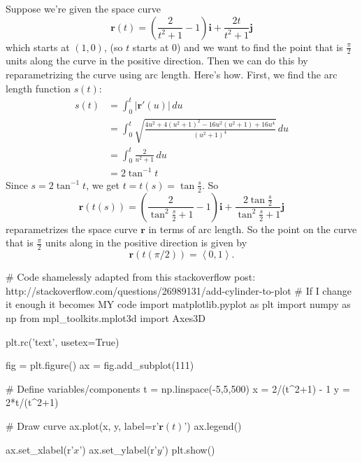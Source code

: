 \documentclass[10pt,]{book}
\theoremstyle{ptxplainnotitle}
\theoremstyle{ptxplaintitle}
\theoremstyle{ptxplainnotitle}
\theoremstyle{ptxplaintitle}
\theoremstyle{ptxplainnotitle}
\theoremstyle{ptxplaintitle}
\theoremstyle{ptxdefinitionnotitle}
\theoremstyle{ptxdefinitiontitle}
\theoremstyle{ptxdefinitionnotitle}
\theoremstyle{ptxdefinitiontitle}
\theoremstyle{ptxdefinitionnotitle}
\theoremstyle{ptxdefinitiontitle}
\theoremstyle{ptxdefinitionnotitle}
\theoremstyle{ptxdefinitiontitle}
\theoremstyle{ptxdefinitionnotitle}
\theoremstyle{ptxdefinitiontitle}
\numberwithin{equation}{section}
\newcommand{\vv}[1]{\mathbf{#1}}
\newcommand{\dotprod}[1]{\left\langle #1 \right\rangle}
\begin{document}
\begin{example}\label{example-reparametrizing-a-space-curve}
\hypertarget{p-938}{}%
Suppose we're given the space curve%
%
\begin{equation*}
\vv{r}(t) = \left(\frac{2}{t^{2}+1}-1\right)\vv{i}+\frac{2t}{t^{2}+1}\vv{j}
\end{equation*}
\hypertarget{p-939}{}%
which starts at \((1,0)\), (so \(t\) starts at \(0\)) and we want to find the point that is \(\frac{\pi}{2}\) units along the curve in the positive direction. Then we can do this by reparametrizing the curve using arc length. Here's how. First, we find the arc length function \(s(t)\):%
%
\begin{align*}
s(t) & = \int_{0}^{t}|\vv{r}'(u)|\,du \\
& = \int_{0}^{t} \sqrt{\frac{4u^{2}+4(u^{2}+1)^{2}-16u^{2}(u^{2}+1)+16u^{4}}{(u^{2}+1)^{4}}}\,du \\
& = \int_{0}^{t} \frac{2}{u^{2}+1}\,du \\
& = 2\tan^{-1}t 
\end{align*}
\hypertarget{p-940}{}%
Since \(s = 2\tan^{-1}t\), we get \(t = t(s) = \tan\frac{s}{2}\). So%
%
\begin{equation*}
\vv{r}(t(s)) = \left(\frac{2}{\tan^{2}\frac{s}{2}+1}-1\right)\vv{i}+\frac{2\tan\frac{s}{2}}{\tan^{2}\frac{s}{2}+1}\vv{j}
\end{equation*}
\hypertarget{p-941}{}%
reparametrizes the space curve \(\vv{r}\) in terms of arc length. So the point on the curve that is \(\frac{\pi}{2}\) units along in the positive direction is given by%
%
\begin{equation*}
\vv{r}(t(\pi/2)) = \dotprod{0,1}.
\end{equation*}
\end{example}
\begin{sageinput}
# Code shamelessly adapted from this stackoverflow post: http://stackoverflow.com/questions/26989131/add-cylinder-to-plot
# If I change it enough it becomes MY code
import matplotlib.pyplot as plt
import numpy as np
from mpl_toolkits.mplot3d import Axes3D

plt.rc('text', usetex=True)

fig = plt.figure()
ax = fig.add_subplot(111)

# Define variables/components
t = np.linspace(-5,5,500)
x = 2/(t^2+1) - 1
y = 2*t/(t^2+1)

# Draw curve
ax.plot(x, y, label=r'$\mathbf{r}(t)$')
ax.legend()

ax.set_xlabel(r'$x$')
ax.set_ylabel(r'$y$')
plt.show()
\end{sageinput}
\typeout{************************************************}
\typeout{************************************************}
\end{document}
